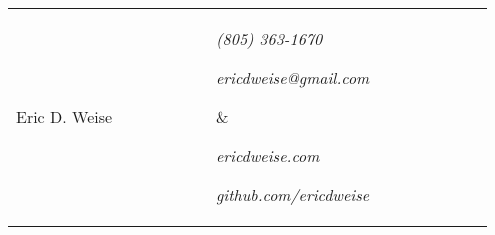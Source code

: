 \begin{tabular}{p{0.45\linewidth}p{0.25\linewidth}p{0.25\linewidth}}
    {\Huge Eric D. Weise }
    &
    \parbox[b]{0.24\textwidth}{%
        \hfill {\sl (805) 363-1670}

        \hfill {\sl ericdweise@gmail.com}
        }
    &
    \parbox[b]{0.24\textwidth}{%
        \hfill {\sl ericdweise.com}

        \hfill {\sl github.com/ericdweise}
    }
\end{tabular}
\newline
\noindent\makebox[\linewidth]{\rule{\linewidth}{0.6pt}}
